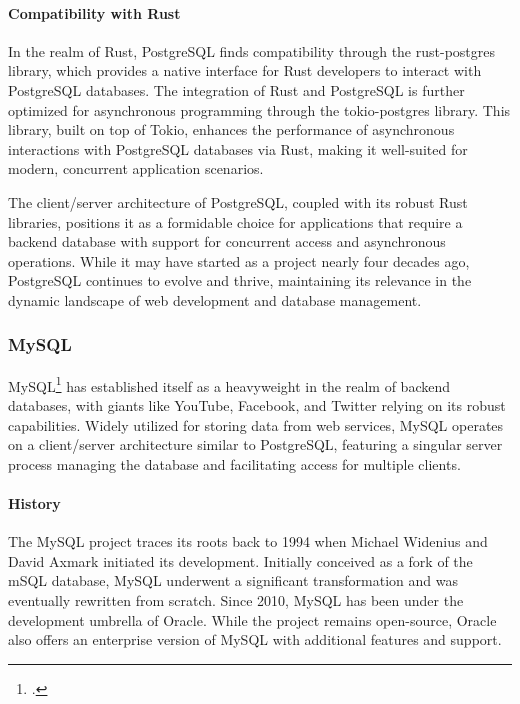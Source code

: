 \paragraph{Compatibility with Rust}
In the realm of Rust, PostgreSQL finds compatibility through the rust-postgres library, which provides a native interface for Rust developers to interact with 
PostgreSQL databases. The integration of Rust and PostgreSQL is further optimized for asynchronous programming through the tokio-postgres library. This library, 
built on top of Tokio, enhances the performance of asynchronous interactions with PostgreSQL databases via Rust, making it well-suited for modern, concurrent 
application scenarios.\newline

The client/server architecture of PostgreSQL, coupled with its robust Rust libraries, positions it as a formidable choice for applications that require a 
backend database with support for concurrent access and asynchronous operations. While it may have started as a project nearly four decades ago, PostgreSQL 
continues to evolve and thrive, maintaining its relevance in the dynamic landscape of web development and database management.

\subsubsection{MySQL}
MySQL\footcite{mysql} has established itself as a heavyweight in the realm of backend databases, with giants like YouTube, Facebook, and Twitter relying on its 
robust capabilities. Widely utilized for storing data from web services, MySQL operates on a client/server architecture similar to PostgreSQL, featuring a 
singular server process managing the database and facilitating access for multiple clients.\newline

\paragraph{History}
The MySQL project traces its roots back to 1994 when Michael Widenius and David Axmark initiated its development. Initially conceived as a fork of the mSQL 
database, MySQL underwent a significant transformation and was eventually rewritten from scratch. Since 2010, MySQL has been under the development umbrella of 
Oracle. While the project remains open-source, Oracle also offers an enterprise version of MySQL with additional features and support.\newline

